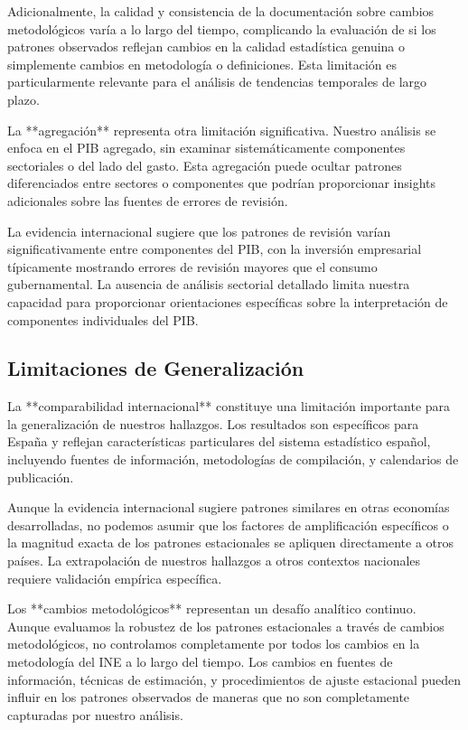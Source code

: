 \documentclass[12pt,a4paper]{article}
\begin{document}
Adicionalmente, la calidad y consistencia de la documentación sobre cambios metodológicos varía a lo largo del tiempo, complicando la evaluación de si los patrones observados reflejan cambios en la calidad estadística genuina o simplemente cambios en metodología o definiciones. Esta limitación es particularmente relevante para el análisis de tendencias temporales de largo plazo.

La **agregación** representa otra limitación significativa. Nuestro análisis se enfoca en el PIB agregado, sin examinar sistemáticamente componentes sectoriales o del lado del gasto. Esta agregación puede ocultar patrones diferenciados entre sectores o componentes que podrían proporcionar insights adicionales sobre las fuentes de errores de revisión.

La evidencia internacional sugiere que los patrones de revisión varían significativamente entre componentes del PIB, con la inversión empresarial típicamente mostrando errores de revisión mayores que el consumo gubernamental. La ausencia de análisis sectorial detallado limita nuestra capacidad para proporcionar orientaciones específicas sobre la interpretación de componentes individuales del PIB.

\subsection{Limitaciones de Generalización}

La **comparabilidad internacional** constituye una limitación importante para la generalización de nuestros hallazgos. Los resultados son específicos para España y reflejan características particulares del sistema estadístico español, incluyendo fuentes de información, metodologías de compilación, y calendarios de publicación.

Aunque la evidencia internacional sugiere patrones similares en otras economías desarrolladas, no podemos asumir que los factores de amplificación específicos o la magnitud exacta de los patrones estacionales se apliquen directamente a otros países. La extrapolación de nuestros hallazgos a otros contextos nacionales requiere validación empírica específica.

Los **cambios metodológicos** representan un desafío analítico continuo. Aunque evaluamos la robustez de los patrones estacionales a través de cambios metodológicos, no controlamos completamente por todos los cambios en la metodología del INE a lo largo del tiempo. Los cambios en fuentes de información, técnicas de estimación, y procedimientos de ajuste estacional pueden influir en los patrones observados de maneras que no son completamente capturadas por nuestro análisis.
\end{document}
